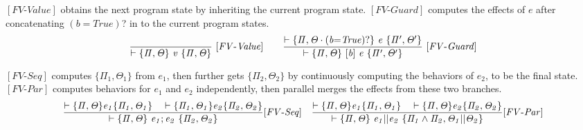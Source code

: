\documentclass[acmsmall,10pt,review]{acmart}
\newcommand{\code}[1]{{\tt{\ensuremath{\m{#1}}}}}
\newcommand{\m}{\mathit}
\begin{document}
{\begin{comment}
\end{comment}

$[FV\text{-}\m{Value}]$  obtains the next program state by 
inheriting the current program state.
$[FV\text{-}Guard]$ computes the effects of \code{e} after concatenating
\code{(b{=}True)}? in to the current program states.  
{{\small\begin{gather*}
  \code{\frac{
  }
{  \vdash \{  \Pi, \Theta \}\  v \ 
\{ \Pi, \Theta \}} \  
 {[FV\text{-}Value]}} 
 \qquad
 \code{\frac{
  \vdash \{  \Pi, \Theta \cdot (b{=}True)? \}\  e \ 
  \{ \Pi^\prime, \Theta^\prime \}
  }
{  \vdash \{  \Pi, \Theta \}\  [b]\ e \ 
\{  \Pi^\prime, \Theta^\prime \}} \  
 {[FV\text{-}Guard]}} 
\end{gather*}}}

$[FV\text{-}Seq]$ computes  \code{ \{  \Pi_1, \Theta_1\} } 
from \code{e_1}, 
then further gets  \code{ \{  \Pi_2, \Theta_2 \} } by 
continuously computing the behaviors of \code{e_2}, to be the final state.
$[FV\text{-}Par]$ computes behaviors for  \code{e_1} and \code{e_2} independently,
then parallel merges the effects from these two branches.  
{{\small\begin{gather*}
  \code{\frac{ 
 \vdash \{ \Pi, \Theta\}  e_1  \{  \Pi_1, \Theta_1\} 
\ \  \ 
\vdash \{ \Pi_1, \Theta_1\}  e_2   \{  \Pi_2, \Theta_2 \} 
}{
  \vdash \{  \Pi, \Theta \}\  
  e_1;e_2 \ \{ \Pi_2, \Theta_2
  \}} 
   {[FV\text{-}Seq]}}  
\quad 
  \code{\frac{
 \vdash \{ \Pi, \Theta \}  e_1   \{  \Pi_1, \Theta_1\} 
\ \  \ 
\vdash \{  \Pi, \Theta \}  e_2   \{  \Pi_2, \Theta_2 \} 
    }{
\vdash \{   \Pi, \Theta \}\  e_1 || e_2 \ \{ 
\Pi_1  \wedge \Pi_2 , \Theta_1 || \Theta_2
\}}  
{[FV\text{-}Par]}} 
\end{gather*}}}

}
\end{document}
